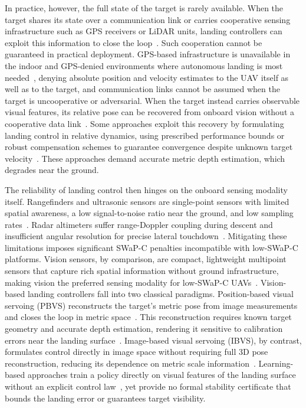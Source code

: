 \documentclass{IEEEtaes}
\begin{document}
In practice, however, the full state of the target is rarely available. When the target shares its state over a communication link or carries cooperative sensing infrastructure such as GPS receivers or LiDAR units, landing controllers can exploit this information to close the loop~\cite{marcon2018,isilak2025,bouazza2025,cho2022}. Such cooperation cannot be guaranteed in practical deployment. GPS-based infrastructure is unavailable in the indoor and GPS-denied environments where autonomous landing is most needed~\cite{bautista2023,niu2022}, denying absolute position and velocity estimates to the UAV itself as well as to the target, and communication links cannot be assumed when the target is uncooperative or adversarial. When the target instead carries observable visual features, its relative pose can be recovered from onboard vision without a cooperative data link~\cite{wenzel2010}. Some approaches exploit this recovery by formulating landing control in relative dynamics, using prescribed performance bounds or robust compensation schemes to guarantee convergence despite unknown target velocity~\cite{lin2022,zhao2021}. These approaches demand accurate metric depth estimation, which degrades near the ground.

The reliability of landing control then hinges on the onboard sensing modality itself. Rangefinders and ultrasonic sensors are single-point sensors with limited spatial awareness, a low signal-to-noise ratio near the ground, and low sampling rates~\cite{zhao2012}. Radar altimeters suffer range-Doppler coupling during descent and insufficient angular resolution for precise lateral touchdown~\cite{awan2024,veneruso2025}. Mitigating these limitations imposes significant SWaP-C penalties incompatible with low-SWaP-C platforms. Vision sensors, by comparison, are compact, lightweight multipoint sensors that capture rich spatial information without ground infrastructure, making vision the preferred sensing modality for low-SWaP-C UAVs~\cite{semerikov2025,lin2023,angelis2026}. Vision-based landing controllers fall into two classical paradigms. Position-based visual servoing (PBVS) reconstructs the target's metric pose from image measurements and closes the loop in metric space~\cite{lin2022,zhang2026}. This reconstruction requires known target geometry and accurate depth estimation, rendering it sensitive to calibration errors near the landing surface~\cite{lin2022,zhao2021}. Image-based visual servoing (IBVS), by contrast, formulates control directly in image space without requiring full 3D pose reconstruction, reducing its dependence on metric scale information~\cite{lin2023,cho2022}. Learning-based approaches train a policy directly on visual features of the landing surface without an explicit control law~\cite{angelis2026}, yet provide no formal stability certificate that bounds the landing error or guarantees target visibility.
\end{document}
